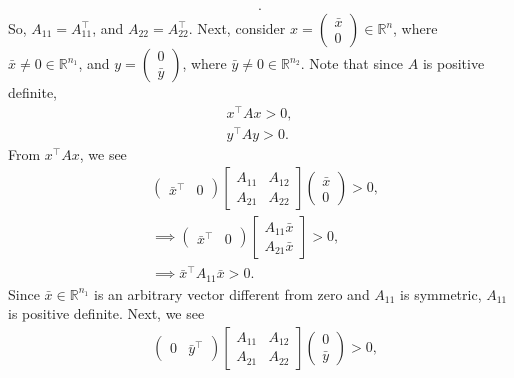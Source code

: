 \documentclass{report}
\begin{document}
\begin{remark}
\begin{align*}
    .\end{align*}
    So, $A_{11} = A_{11}^{\top}$, and $A_{22} = A_{22}^{\top}$.
    \bigbreak \noindent 
    Next, consider $x = \begin{pmatrix} \bar{x} \\ 0 \end{pmatrix} \in \mathbb{R}^{n}$, where $\bar{x} \ne 0 \in \mathbb{R}^{n_{1}} $, and $y = \begin{pmatrix} 0 \\ \bar{y} \end{pmatrix} $, where $\bar{y} \ne 0\in \mathbb{R}^{n_{2}} $. Note that since $A$ is positive definite, 
    \begin{align*}
        x^{\top}Ax > 0, \\
        y^{\top}Ay >0
    .\end{align*}
    From $x^{\top}Ax$, we see
    \begin{align*}
        &\begin{pmatrix} \bar{x}^{\top} & 0 \end{pmatrix} \begin{bmatrix} A_{11} & A_{12} \\ A_{21} & A_{22} \end{bmatrix} \begin{pmatrix} \bar{x} \\ 0 \end{pmatrix} > 0, \\
        &\implies \begin{pmatrix} \bar{x}^{\top} & 0  \end{pmatrix} \begin{bmatrix} A_{11}\bar{x} \\ A_{21}\bar{x} \end{bmatrix} >0, \\
        &\implies \bar{x}^{\top}A_{11}\bar{x} > 0
    .\end{align*}
    Since $\bar{x} \in \mathbb{R}^{n_{1}} $ is an arbitrary vector different from zero and $A_{11}$ is symmetric, $A_{11}$ is positive definite.
    \bigbreak \noindent 
    Next, we see 
    \begin{align*}
        &\begin{pmatrix} 0 & \bar{y}^{\top} \end{pmatrix} \begin{bmatrix} A_{11} & A_{12} \\ A_{21} & A_{22} \end{bmatrix} \begin{pmatrix} 0 \\ \bar{y} \end{pmatrix} > 0, \\

\end{align*}
\end{remark}
\end{document}
